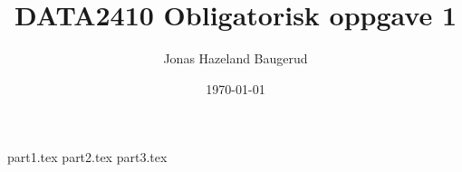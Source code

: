 \documentclass[a4paper,11pt]{article}
\title{DATA2410 Obligatorisk oppgave 1}
\author{Jonas Hazeland Baugerud}
\date{\today}
\begin{document}
\maketitle
\newpage
\tableofcontents
\newpage

{part1.tex}
{part2.tex}
{part3.tex}
\end{document}
